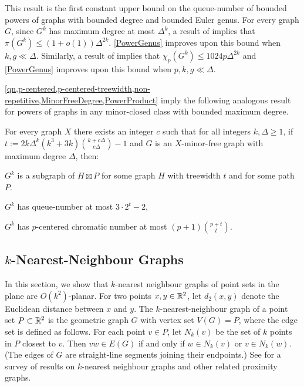 \documentclass{patmorin}
\renewcommand{\le}{\leqslant}
\renewcommand{\geq}{\geqslant}
\renewcommand{\leq}{\leqslant}
\begin{document}
This result is the first constant upper bound on the queue-number of bounded powers of graphs with bounded degree and bounded Euler genus.  For every graph $G$, since $G^k$ has maximum degree at most $\Delta^k$, a result of \citet{DJKW16} implies that $\pi(G^k) \leq (1+o(1))\Delta^{2k}$. \cref{PowerGenus} improves upon this bound when $k,g\ll\Delta$.  Similarly, a result of \citet{DFMS21} implies that $\chi_p(G^k)\le 1024p\Delta^{2k}$ and \cref{PowerGenus} improves upon this bound when $p,k,g\ll\Delta$.

\cref{qn,p-centered,p-centered-treewidth,non-repetitive,MinorFreeDegree,PowerProduct} imply the following analogous result for powers of graphs in any minor-closed class with bounded maximum degree. 

\begin{thm}
\label{PowerMinor}
For every graph $X$ there exists an integer $c$ such that for all integers $k,\Delta\geq 1$, if $t:= 2k\Delta^{k}(k^3+3k)\binom{k+c\Delta}{c\Delta}-1$ and $G$ is an $X$-minor-free graph with maximum degree $\Delta$, then:
\begin{compactitem}
	\item $G^k$ is a subgraph of $H\boxtimes P$ for some graph $H$ with treewidth $t$ and for some path $P$.
	\item $G^k$ has queue-number at most $3\cdot 2^t-2$, 
	\item $G^k$ has $p$-centered chromatic number at most $(p+1)\binom{p+t}{t}$. 
\end{compactitem}
\end{thm}

\subsection{$k$-Nearest-Neighbour Graphs}

In this section, we show that $k$-nearest neighbour graphs of point sets in the plane are $O(k^2)$-planar.  For two points $x,y\in\mathbb{R}^2$, let $d_2(x,y)$ denote the Euclidean distance between $x$ and $y$. The $k$-nearest-neighbour graph of a point set $P\subset\mathbb{R}^2$ is the geometric graph $G$ with vertex set $V(G)=P$, where the edge set is defined as follows. For each point $v\in P$, let $N_k(v)$ be the set of $k$ points in $P$ closest to $v$. Then $vw\in E(G)$ if and only if $w\in N_k(v)$ or $v\in N_k(w)$. (The edges of $G$ are straight-line segments joining their endpoints.) See \citep{ProximityGraphs} for a survey of results on $k$-nearest neighbour graphs and other related proximity graphs.
\end{document}
